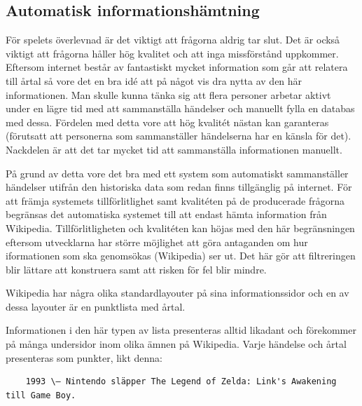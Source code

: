 \documentclass[a4paper, 11pt]{article}
\begin{document}
\subsection{Automatisk informationshämtning}
För spelets överlevnad är det viktigt att frågorna aldrig tar slut. Det är också viktigt att frågorna håller hög kvalitet och att inga missförstånd uppkommer. Eftersom internet består av fantastiskt mycket information som går att relatera till årtal så vore det en bra idé att på något vis dra nytta av den här informationen. Man skulle kunna tänka sig att flera personer arbetar aktivt under en lägre tid med att sammanställa händelser och manuellt fylla en databas med dessa. Fördelen med detta vore att hög kvalitét nästan kan garanteras (förutsatt att personerna som sammanställer händelserna har en känsla för det). Nackdelen är att det tar mycket tid att sammanställa informationen manuellt.

På grund av detta vore det bra med ett system som automatiskt sammanställer händelser utifrån den historiska data som redan finns tillgänglig på internet. För att främja systemets tillförlitlighet samt kvalitéten på de producerade frågorna begränsas det automatiska systemet till att endast hämta information från Wikipedia. Tillförlitligheten och kvalitéten kan höjas med den här begränsningen eftersom utvecklarna har större möjlighet att göra antaganden om hur iformationen som ska genomsökas (Wikipedia) ser ut. Det här gör att filtreringen blir lättare att konstruera samt att risken för fel blir mindre.

Wikipedia har några olika standardlayouter på sina informationssidor och en av dessa layouter är en punktlista med årtal. 


Informationen i den här typen av lista presenteras alltid likadant och förekommer på många undersidor inom olika ämnen på Wikipedia. Varje händelse och årtal presenteras som punkter, likt denna:

\begin{verbatim}
	1993 \– Nintendo släpper The Legend of Zelda: Link's Awakening till Game Boy.
\end{verbatim}
\end{document}
